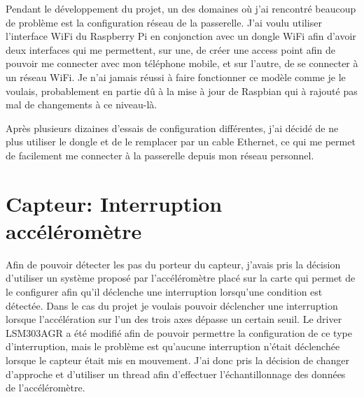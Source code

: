 Pendant le développement du projet, un des domaines où j'ai rencontré beaucoup de problème est la configuration réseau de la passerelle. J'ai voulu utiliser l'interface WiFi du Raspberry Pi en conjonction avec un dongle WiFi afin d'avoir deux interfaces qui me permettent, sur une, de créer une access point afin de pouvoir me connecter avec mon téléphone mobile, et sur l'autre, de se connecter à un réseau WiFi. Je n'ai jamais réussi à faire fonctionner ce modèle comme je le voulais, probablement en partie dû à la mise à jour de Raspbian qui à rajouté pas mal de changements à ce niveau-là.

Après plusieurs dizaines d'essais de configuration différentes, j'ai décidé de ne plus utiliser le dongle et de le remplacer par un cable Ethernet, ce qui me permet de facilement me connecter à la passerelle depuis mon réseau personnel.

\section{Capteur: Interruption accéléromètre}

Afin de pouvoir détecter les pas du porteur du capteur, j'avais pris la décision d'utiliser un système proposé par l'accéléromètre placé sur la carte qui permet de le configurer afin qu'il déclenche une interruption lorsqu'une condition est détectée. Dans le cas du projet je voulais pouvoir déclencher une interruption lorsque l'accélération sur l'un des trois axes dépasse un certain seuil. Le driver LSM303AGR a été modifié afin de pouvoir permettre la configuration de ce type d'interruption, mais le problème est qu’aucune interruption n'était déclenchée lorsque le capteur était mis en mouvement. J’ai donc pris la décision de changer d'approche et d'utiliser un thread afin d'effectuer l'échantillonnage des données de l'accéléromètre.